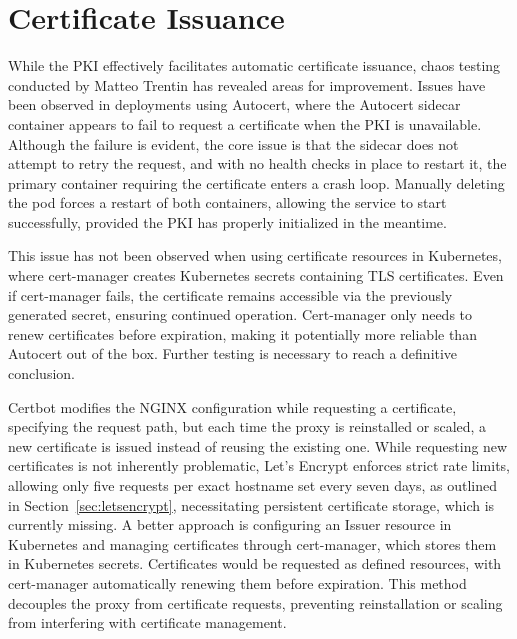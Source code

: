\section{Certificate Issuance}
While the PKI effectively facilitates automatic certificate issuance, chaos testing conducted by Matteo Trentin has revealed areas for improvement. Issues have been observed in deployments using Autocert, where the Autocert sidecar container appears to fail to request a certificate when the PKI is unavailable. Although the failure is evident, the core issue is that the sidecar does not attempt to retry the request, and with no health checks in place to restart it, the primary container requiring the certificate enters a crash loop. Manually deleting the pod forces a restart of both containers, allowing the service to start successfully, provided the PKI has properly initialized in the meantime.

This issue has not been observed when using certificate resources in Kubernetes, where cert-manager creates Kubernetes secrets containing TLS certificates. Even if cert-manager fails, the certificate remains accessible via the previously generated secret, ensuring continued operation. Cert-manager only needs to renew certificates before expiration, making it potentially more reliable than Autocert out of the box. Further testing is necessary to reach a definitive conclusion.

Certbot modifies the NGINX configuration while requesting a certificate, specifying the request path, but each time the proxy is reinstalled or scaled, a new certificate is issued instead of reusing the existing one. While requesting new certificates is not inherently problematic, Let's Encrypt enforces strict rate limits, allowing only five requests per exact hostname set every seven days, as outlined in Section~\ref{sec:letsencrypt}, necessitating persistent certificate storage, which is currently missing. A better approach is configuring an Issuer resource in Kubernetes and managing certificates through cert-manager, which stores them in Kubernetes secrets. Certificates would be requested as defined resources, with cert-manager automatically renewing them before expiration. This method decouples the proxy from certificate requests, preventing reinstallation or scaling from interfering with certificate management.

